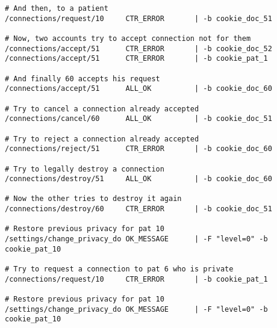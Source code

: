 \begin{verbatim}
# And then, to a patient
/connections/request/10		CTR_ERROR		| -b cookie_doc_51

# Now, two accounts try to accept connection not for them
/connections/accept/51		CTR_ERROR		| -b cookie_doc_52
/connections/accept/51		CTR_ERROR		| -b cookie_pat_1

# And finally 60 accepts his request
/connections/accept/51		ALL_OK			| -b cookie_doc_60

# Try to cancel a connection already accepted
/connections/cancel/60		ALL_OK			| -b cookie_doc_51

# Try to reject a connection already accepted
/connections/reject/51		CTR_ERROR		| -b cookie_doc_60

# Try to legally destroy a connection
/connections/destroy/51		ALL_OK			| -b cookie_doc_60

# Now the other tries to destroy it again
/connections/destroy/60		CTR_ERROR		| -b cookie_doc_51

# Restore previous privacy for pat 10
/settings/change_privacy_do	OK_MESSAGE		| -F "level=0" -b cookie_pat_10

# Try to request a connection to pat 6 who is private
/connections/request/10		CTR_ERROR		| -b cookie_pat_1

# Restore previous privacy for pat 10
/settings/change_privacy_do	OK_MESSAGE		| -F "level=0" -b cookie_pat_10
\end{verbatim}


